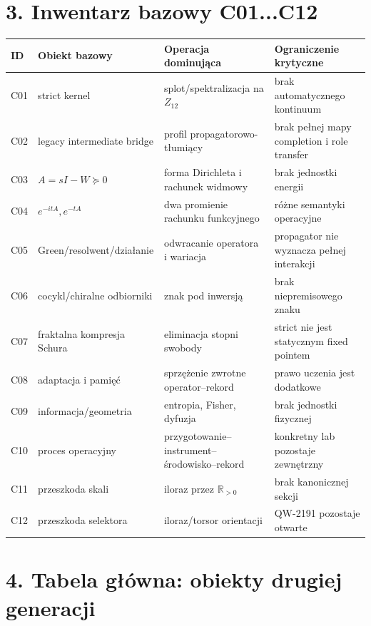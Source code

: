 \documentclass[11pt,a4paper,openany]{report}
\begin{document}
\chapter{3. Inwentarz bazowy C01...C12}

\begin{center}
\begingroup\small
\setlength{\tabcolsep}{2.5pt}
\renewcommand{\arraystretch}{1.16}
\begin{longtable}{@{}p{}p{}p{}p{}@{}}
\toprule
\textbf{ID} & \textbf{Obiekt bazowy} & \textbf{Operacja dominująca} & \textbf{Ograniczenie krytyczne} \\
\midrule
\endhead
C01 & strict kernel & splot/\allowbreak{}spektralizacja na \(Z_{12}\) & brak automatycznego kontinuum \\
C02 & legacy intermediate bridge & profil propagatorowo-tłumiący & brak pełnej mapy completion i role transfer \\
C03 & \(A=sI-W\succeq0\) & forma Dirichleta i rachunek widmowy & brak jednostki energii \\
C04 & \(e^{-itA},e^{-tA}\) & dwa promienie rachunku funkcyjnego & ró\.zne semantyki operacyjne \\
C05 & Green/\allowbreak{}resolwent/\allowbreak{}działanie & odwracanie operatora i wariacja & propagator nie wyznacza pełnej interakcji \\
C06 & cocykl/\allowbreak{}chiralne odbiorniki & znak pod inwersją & brak niepremisowego znaku \\
C07 & fraktalna kompresja Schura & eliminacja stopni swobody & strict nie jest statycznym fixed pointem \\
C08 & adaptacja i pamięć & sprzę\.zenie zwrotne operator--rekord & prawo uczenia jest dodatkowe \\
C09 & informacja/\allowbreak{}geometria & entropia, Fisher, dyfuzja & brak jednostki fizycznej \\
C10 & proces operacyjny & przygotowanie--instrument--środowisko--rekord & konkretny lab pozostaje zewnętrzny \\
C11 & przeszkoda skali & iloraz przez \(\mathbb R_{>0}\) & brak kanonicznej sekcji \\
C12 & przeszkoda selektora & iloraz/\allowbreak{}torsor orientacji & QW-2191 pozostaje otwarte \\
\bottomrule
\end{longtable}
\endgroup
\end{center}

\chapter{4. Tabela główna: obiekty drugiej generacji}
\end{document}
